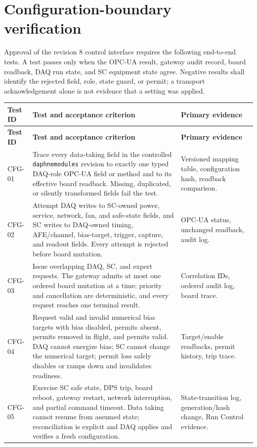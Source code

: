 \section{Configuration-boundary verification}
\label{sec:ownership-verification}

Approval of the revision 8 control interface requires the following end-to-end tests. A
test passes only when the OPC-UA result, gateway audit record, board readback, DAQ run
state, and SC equipment state agree. Negative results shall identify the rejected field,
role, state guard, or permit; a transport acknowledgement alone is not evidence that a
setting was applied.

\begin{longtable}{@{}p{2.2cm}p{8.2cm}p{4.4cm}@{}}
\toprule
\textbf{Test ID} & \textbf{Test and acceptance criterion} & \textbf{Primary evidence} \\
\midrule
\endfirsthead
\toprule
\textbf{Test ID} & \textbf{Test and acceptance criterion} & \textbf{Primary evidence} \\
\midrule
\endhead
CFG-01 & Trace every data-taking field in the controlled \texttt{daphnemodules} revision to exactly one typed DAQ-role OPC-UA field or method and to its effective board readback. Missing, duplicated, or silently transformed fields fail the test. & Versioned mapping table, configuration hash, readback comparison. \\
CFG-02 & Attempt DAQ writes to SC-owned power, service, network, fan, and safe-state fields, and SC writes to DAQ-owned timing, AFE/channel, bias-target, trigger, capture, and readout fields. Every attempt is rejected before board mutation. & OPC-UA status, unchanged readback, audit log. \\
CFG-03 & Issue overlapping DAQ, SC, and expert requests. The gateway admits at most one ordered board mutation at a time; priority and cancellation are deterministic, and every request reaches one terminal result. & Correlation IDs, ordered audit log, board trace. \\
CFG-04 & Request valid and invalid numerical bias targets with bias disabled, permits absent, permits removed in flight, and permits valid. DAQ cannot energize bias; SC cannot change the numerical target; permit loss safely disables or ramps down and invalidates readiness. & Target/enable readbacks, permit history, trip trace. \\
CFG-05 & Exercise SC safe state, DPS trip, board reboot, gateway restart, network interruption, and partial command timeout. Data taking cannot resume from assumed state; reconciliation is explicit and DAQ applies and verifies a fresh configuration. & State-transition log, generation/hash change, Run Control evidence. \\

\end{longtable}

